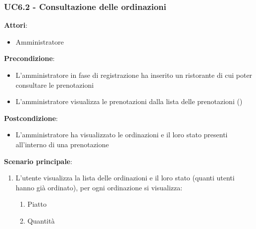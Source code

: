 \subsubsection{UC6.2 - Consultazione delle ordinazioni}\label{usecase:6_2}
\textbf{Attori}:
\begin{itemize}
    \item Amministratore
\end{itemize}
\textbf{Precondizione}:
\begin{itemize}
    \item L'amministratore in fase di registrazione ha inserito un ristorante di cui poter consultare le prenotazioni
    \item L'amministratore visualizza le prenotazioni dalla lista delle prenotazioni ()
\end{itemize}
\textbf{Postcondizione}:
\begin{itemize}
    \item L'amministratore ha visualizzato le ordinazioni e il loro stato presenti all'interno di una prenotazione
\end{itemize}
\textbf{Scenario principale}:
\begin{enumerate}
    \item L'utente visualizza la lista delle ordinazioni e il loro stato (quanti utenti hanno già ordinato), per ogni ordinazione si visualizza:
    \begin{enumerate}
        \item Piatto
        \item Quantità
    \end{enumerate}
\end{enumerate}
\newpage